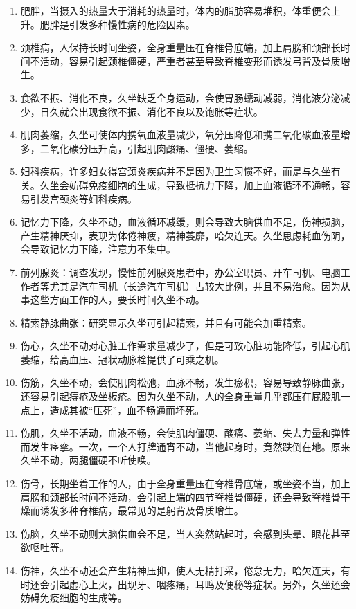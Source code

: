 \documentclass[fontset=founder]{ctexart}
\begin{document}
\begin{enumerate}
    \item 肥胖，当摄入的热量大于消耗的热量时，体内的脂肪容易堆积，体重便会上升。肥胖是引发多种慢性病的危险因素。
    \item 颈椎病，人保持长时间坐姿，全身重量压在脊椎骨底端，加上肩膀和颈部长时间不活动，容易引起颈椎僵硬，严重者甚至导致脊椎变形而诱发弓背及骨质增生。
    \item 食欲不振、消化不良，久坐缺乏全身运动，会使胃肠蠕动减弱，消化液分泌减少，日久就会出现食欲不振、消化不良以及饱胀等症状。
    \item 肌肉萎缩，久坐可使体内携氧血液量减少，氧分压降低和携二氧化碳血液量增多，二氧化碳分压升高，引起肌肉酸痛、僵硬、萎缩。
    \item 妇科疾病，许多妇女得宫颈炎疾病并不是因为卫生习惯不好，而是与久坐有关。久坐会妨碍免疫细胞的生成，导致抵抗力下降，加上血液循环不通畅，容易引发宫颈炎等妇科疾病。
    \item 记忆力下降，久坐不动，血液循环减缓，则会导致大脑供血不足，伤神损脑，产生精神厌抑，表现为体倦神疲，精神萎靡，哈欠连天。久坐思虑耗血伤阴，会导致记忆力下降，注意力不集中。
    \item 前列腺炎：调查发现，慢性前列腺炎患者中，办公室职员、开车司机、电脑工作者等尤其是汽车司机（长途汽车司机）占较大比例，并且不易治愈。因为从事这些方面工作的人，要长时间久坐不动。
    \item 精索静脉曲张：研究显示久坐可引起精索，并且有可能会加重精索。
    \item 伤心，久坐不动对心脏工作需求量减少了，但是可致心脏功能降低，引起心肌萎缩，给高血压、冠状动脉栓提供了可乘之机。
    \item 伤筋，久坐不动，会使肌肉松弛，血脉不畅，发生瘀积，容易导致静脉曲张，还容易引起痔疮及坐板疮。因为久坐不动，人的全身重量几乎都压在屁股肌一点上，造成其被“压死”，血不畅通而坏死。
    \item 伤肌，久坐不活动，血液不畅，会使肌肉僵硬、酸痛、萎缩、失去力量和弹性而发生痉挛。一次，一个人打牌通宵不动，当他起身时，竟然跌倒在地。原来久坐不动，两腿僵硬不听使唤。
    \item 伤骨，长期坐着工作的人，由于全身重量压在脊椎骨底端，或坐姿不当，加上肩膀和颈部长时间不活动，会引起上端的四节脊椎骨僵硬，还会导致脊椎骨干燥而诱发多种脊椎病，最常见的是躬背及骨质增生。
    \item 伤脑，久坐不动则大脑供血会不足，当人突然站起时，会感到头晕、眼花甚至欲呕吐等。
    \item 伤神，久坐不动还会产生精神压抑，使人无精打采，倦怠无力，哈欠连天，有时还会引起虚心上火，出现牙、咽疼痛，耳鸣及便秘等症状。另外，久坐还会妨碍免疫细胞的生成等。

\end{enumerate}
\end{document}
